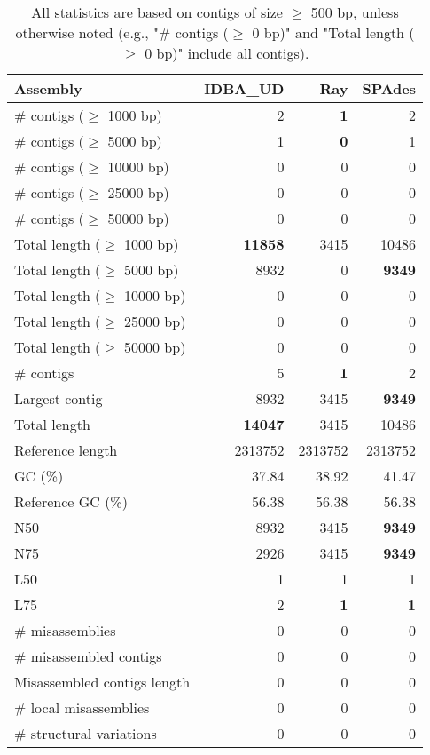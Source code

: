 \documentclass[12pt,a4paper]{article}
\begin{document}
\begin{table}[ht]
\begin{center}
\caption{All statistics are based on contigs of size $\geq$ 500 bp, unless otherwise noted (e.g., "\# contigs ($\geq$ 0 bp)" and "Total length ($\geq$ 0 bp)" include all contigs).}
\begin{tabular}{|l*{3}{|r}|}
\hline
Assembly & IDBA\_UD & Ray & SPAdes \\ \hline
\# contigs ($\geq$ 1000 bp) & 2 & {\bf 1} & 2 \\ \hline
\# contigs ($\geq$ 5000 bp) & 1 & {\bf 0} & 1 \\ \hline
\# contigs ($\geq$ 10000 bp) & 0 & 0 & 0 \\ \hline
\# contigs ($\geq$ 25000 bp) & 0 & 0 & 0 \\ \hline
\# contigs ($\geq$ 50000 bp) & 0 & 0 & 0 \\ \hline
Total length ($\geq$ 1000 bp) & {\bf 11858} & 3415 & 10486 \\ \hline
Total length ($\geq$ 5000 bp) & 8932 & 0 & {\bf 9349} \\ \hline
Total length ($\geq$ 10000 bp) & 0 & 0 & 0 \\ \hline
Total length ($\geq$ 25000 bp) & 0 & 0 & 0 \\ \hline
Total length ($\geq$ 50000 bp) & 0 & 0 & 0 \\ \hline
\# contigs & 5 & {\bf 1} & 2 \\ \hline
Largest contig & 8932 & 3415 & {\bf 9349} \\ \hline
Total length & {\bf 14047} & 3415 & 10486 \\ \hline
Reference length & 2313752 & 2313752 & 2313752 \\ \hline
GC (\%) & 37.84 & 38.92 & 41.47 \\ \hline
Reference GC (\%) & 56.38 & 56.38 & 56.38 \\ \hline
N50 & 8932 & 3415 & {\bf 9349} \\ \hline
N75 & 2926 & 3415 & {\bf 9349} \\ \hline
L50 & 1 & 1 & 1 \\ \hline
L75 & 2 & {\bf 1} & {\bf 1} \\ \hline
\# misassemblies & 0 & 0 & 0 \\ \hline
\# misassembled contigs & 0 & 0 & 0 \\ \hline
Misassembled contigs length & 0 & 0 & 0 \\ \hline
\# local misassemblies & 0 & 0 & 0 \\ \hline
\# structural variations & 0 & 0 & 0 \\ \hline

\end{tabular}
\end{center}
\end{table}
\end{document}
